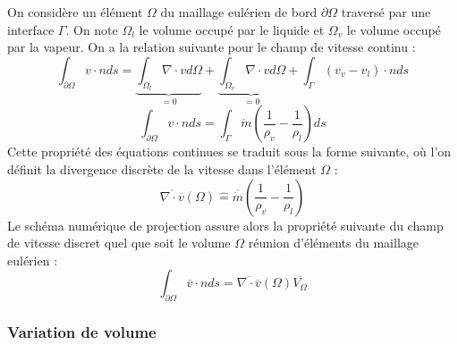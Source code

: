 On consid\`ere un \'el\'ement $\Omega$ du maillage eul\'erien de bord $\partial\Omega$ travers\'e par une interface $\Gamma$. On note $\Omega_{l}$ le volume occup\'e par le liquide et $\Omega_{v}$ le volume occup\'e par la vapeur. On a la relation suivante pour le champ de vitesse continu :
\begin{equation}
\int_{\partial\Omega} v \cdot n ds = \underbrace{\int_{\Omega_{l}} \nabla \cdot v d\Omega}_{=0} + \underbrace{\int_{\Omega_{v}} \nabla \cdot v d\Omega}_{=0} + \int_{\Gamma} (v_{v} - v_{l}) \cdot n ds
\end{equation}
\begin{equation}
\int_{\partial\Omega} v \cdot n ds = \int_{\Gamma} \dot{m} \left( \dfrac{1}{\rho_{v}} - \dfrac{1}{\rho_{l}}\right) ds
\end{equation}
Cette propri\'et\'e des \'equations continues se traduit sous la forme suivante, o\`u l'on d\'efinit la divergence discrète de la vitesse dans l'\'el\'ement $\Omega$ :
\begin{equation}
\overline{\nabla \cdot \overline{v}}(\Omega) \hat{=} \overline{\dot{m}} \left( \dfrac{1}{\rho_{v}} - \dfrac{1}{\rho_{l}}\right) \label{eq:FTD_divV}
\end{equation}
Le sch\'ema num\'erique de projection assure alors la propri\'et\'e suivante du
champ de vitesse discret quel que soit le volume $\Omega$ r\'eunion d'\'el\'ements du maillage eul\'erien :
\begin{equation}
\int_{\partial\Omega} \overline{v} \cdot n ds =\overline{\nabla \cdot \overline{v}}(\Omega) \overline{V_{\Omega}} \label{eq:FTD_bilanMasse}
\end{equation}

\subsubsection{Variation de volume}

